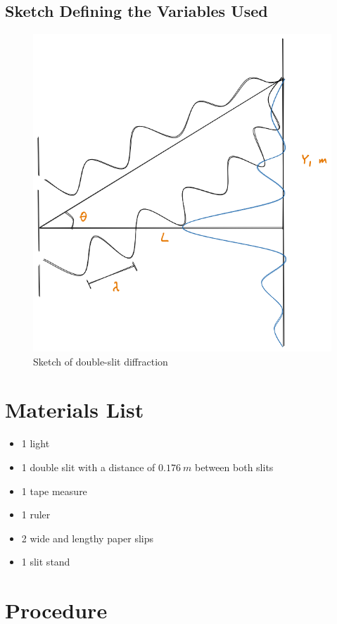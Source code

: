 \documentclass[12pt]{article}
\begin{document}
\subsection{Sketch Defining the Variables Used}

\begin{figure}[H]
	\centering
	\includegraphics[scale=0.7]{sketch.png}
	\caption{Sketch of double-slit diffraction}
\end{figure}

\section{Materials List}

\begin{itemize}
	\item 1 light
	\item 1 double slit with a distance of $0.176\ m$ between both slits
	\item 1 tape measure
	\item 1 ruler
	\item 2 wide and lengthy paper slips
	\item 1 slit stand
\end{itemize}

\section{Procedure}
\end{document}
